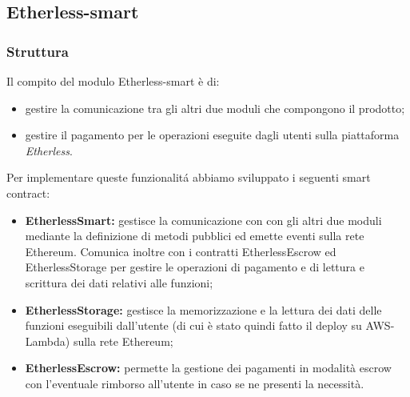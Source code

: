 \subsection{Etherless-smart}

\subsubsection{Struttura}
  Il compito del modulo Etherless-smart è di:
  \begin{itemize}
    \item gestire la comunicazione tra gli altri due moduli che compongono il prodotto;
    \item gestire il pagamento per le operazioni eseguite dagli utenti sulla piattaforma \textit{Etherless}.
  \end{itemize}
  Per implementare queste funzionalitá abbiamo sviluppato i seguenti smart contract:
  \begin{itemize}
    \item \textbf{EtherlessSmart:} gestisce la comunicazione con con gli altri due moduli mediante la definizione di metodi pubblici ed emette eventi sulla rete Ethereum. Comunica inoltre con i contratti EtherlessEscrow ed EtherlessStorage per gestire le operazioni di pagamento e di lettura e scrittura dei dati relativi alle funzioni;
    \item \textbf{EtherlessStorage:} gestisce la memorizzazione e la lettura dei dati delle funzioni eseguibili dall'utente (di cui è stato quindi fatto il deploy su AWS-Lambda) sulla rete Ethereum;
    \item \textbf{EtherlessEscrow:} permette la gestione dei pagamenti in modalità escrow con l'eventuale rimborso all'utente in caso se ne presenti la necessità.
  \end{itemize}

